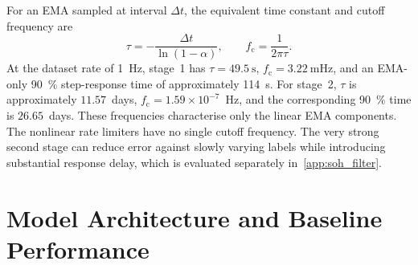 \documentclass[review]{elsarticle}
\begin{document}
For an EMA sampled at interval $\Delta t$, the equivalent time constant and cutoff frequency are
\begin{equation}
    \tau=-\frac{\Delta t}{\ln(1-\alpha)},\qquad
    f_{\mathrm c}=\frac{1}{2\pi\tau}.
\end{equation}
At the dataset rate of \SI{1}{\hertz}, stage~1 has $\tau=\SI{49.5}{\second}$, $f_{\mathrm c}=\SI{3.22}{\milli\hertz}$, and an EMA-only 90~\% step-response time of approximately \SI{114}{\second}. For stage~2, $\tau$ is approximately $11.57$~days, $f_{\mathrm c}=1.59\times10^{-7}$~Hz, and the corresponding 90~\% time is $26.65$~days. These frequencies characterise only the linear EMA components. The nonlinear rate limiters have no single cutoff frequency. The very strong second stage can reduce error against slowly varying labels while introducing substantial response delay, which is evaluated separately in~\ref{app:soh_filter}.
\section{Model Architecture and Baseline Performance}
\end{document}
